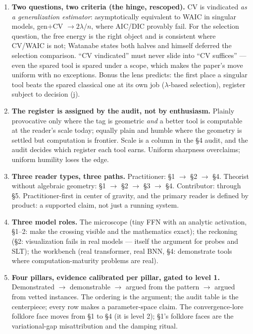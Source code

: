 \documentclass[11pt]{article}
\begin{document}
\begin{enumerate}[label=(\alph*), itemsep=6pt]
\item \textbf{Two questions, two criteria (the hinge, rescoped).} CV is
vindicated \emph{as a generalization estimator}: asymptotically
equivalent to WAIC in singular models, gen$+$CV $\to 2\lambda/n$, where
AIC/DIC provably fail. For the selection question, the free energy is
the right object and is consistent where CV/WAIC is not; Watanabe states
both halves and himself deferred the selection comparison. ``CV
vindicated'' must never slide into ``CV suffices'' --- even the spared
tool is spared under a scope, which makes the paper's move uniform with
no exceptions. Bonus the lens predicts: the first place a singular tool
beats the spared classical one at its own job ($\lambda$-based
selection), register subject to decision (j).

\item \textbf{The register is assigned by the audit, not by
enthusiasm.} Plainly provocative only where the tag is geometric
\emph{and} a better tool is computable at the reader's scale today;
equally plain and humble where the geometry is settled but computation
is frontier. Scale is a column in the \S4 audit, and the audit decides
which register each tool earns. Uniform sharpness overclaims; uniform
humility loses the edge.

\item \textbf{Three reader types, three paths.} Practitioner: \S1 $\to$
\S2 $\to$ \S4. Theorist without algebraic geometry: \S1 $\to$ \S2 $\to$
\S3 $\to$ \S4. Contributor: through \S5. Practitioner-first in center of
gravity, and the primary reader is defined by product: a supported
claim, not just a running system.

\item \textbf{Three model roles.} The microscope (tiny FFN with an
analytic activation, \S1--2: make the crossing visible and the
mathematics exact); the reckoning (\S2: visualization fails in real
models --- itself the argument for probes and SLT); the workbench (real
transformer, real BNN, \S4: demonstrate tools where computation-maturity
problems are real).

\item \textbf{Four pillars, evidence calibrated per pillar, gated to
level 1.} Demonstrated $\to$ demonstrable $\to$ argued from the pattern
$\to$ argued from vetted instances. The ordering is the argument; the
audit table is the centerpiece; every row makes a parameter-space claim.
The convergence-lore folklore face moves from \S1 to \S4 (it is level
2); \S1's folklore faces are the variational-gap misattribution and the
damping ritual.


\end{enumerate}
\end{document}
